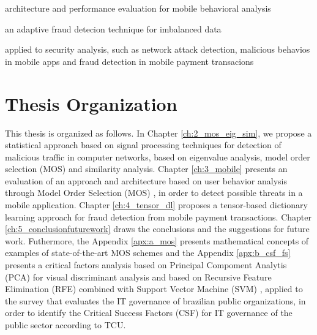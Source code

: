 architecture and performance evaluation for mobile behavioral analysis

an adaptive fraud detecion technique for imbalanced data

applied to security analysis, such as network attack detection, malicious behavios in mobile apps and fraud detection in mobile payment transacions


\section{Thesis Organization}
\label{sc:organization}

This thesis is organized as follows. In Chapter \ref{ch:2_mos_eig_sim}, we propose a statistical approach based on signal processing techniques for detection of malicious traffic in computer networks, based on eigenvalue analysis, model order selection (MOS) and similarity analysis. Chapter \ref{ch:3_mobile} presents an evaluation of an approach and architecture based on user behavior analysis through Model Order Selection (MOS) \cite{tenorio2013greatest}, in order to detect possible threats in a mobile application. Chapter \ref{ch:4_tensor_dl} proposes a tensor-based dictionary learning approach for fraud detection from mobile payment transactions. Chapter \ref{ch:5_conclusionfuturework} draws the conclusions and the suggestions for future work. Futhermore, the Appendix \ref{apx:a_mos} presents mathematical concepts of examples of state-of-the-art MOS schemes and the Appendix \ref{apx:b_csf_fs} presents a critical factors analysis based on Principal Compoment Analytis (PCA) for visual discriminant analysis and based on Recursive Feature Elimination (RFE) combined with Support Vector Machine (SVM) \cite{hearst1998support}, applied to the survey that evaluates the IT governance of brazilian public organizations, in order to identify the Critical Success Factors (CSF) for IT governance of the public sector according to TCU.